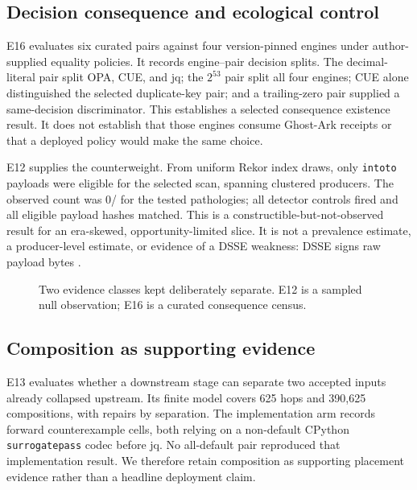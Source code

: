 \documentclass[10pt,twocolumn,letterpaper]{article}
\newcommand{\ghostark}{Ghost-Ark}
\begin{document}
\subsection{Decision consequence and ecological control}

E16 evaluates six curated pairs against four version-pinned engines under
author-supplied equality policies.  It records \pnESixteenCells{} engine--pair
decision splits.  The decimal-literal pair split OPA, CUE, and jq; the
$2^{53}$ pair split all four engines; CUE alone distinguished the selected
duplicate-key pair; and a trailing-zero pair supplied a same-decision
discriminator.  This establishes a selected consequence existence result.  It
does not establish that those engines consume \ghostark{} receipts or that a
deployed policy would make the same choice.

E12 supplies the counterweight.  From \pnETwelveDraws{} uniform Rekor index
draws, only \pnETwelveEligible{} \texttt{intoto} payloads were eligible for
the selected scan, spanning \pnETwelveProducers{} clustered producers.
The observed count was 0/\pnETwelveEligible{} for the tested pathologies; all
\pnETwelveControls{} detector controls fired and all eligible payload hashes
matched.  This is a constructible-but-not-observed result for an
era-skewed, opportunity-limited slice.  It is not a prevalence estimate, a
producer-level estimate, or evidence of a DSSE weakness: DSSE signs raw
payload bytes \cite{dssev1}.

\begin{figure}[t]
  \centering
  \resizebox{\columnwidth}{!}{}
  \caption{Two evidence classes kept deliberately separate.  E12 is a
  sampled null observation; E16 is a curated consequence census.}
  \label{fig:e12-e16}
\end{figure}

\subsection{Composition as supporting evidence}

E13 evaluates whether a downstream stage can separate two accepted inputs
already collapsed upstream.  Its finite model covers 625 hops and 390,625
compositions, with \pnEThirteenRepairsBySeparation{} repairs by separation.
The implementation arm records \pnEThirteenForward{} forward counterexample
cells, both relying on a non-default CPython \texttt{surrogatepass} codec
before jq.  No all-default pair reproduced that implementation result.  We
therefore retain composition as supporting placement evidence rather than a
headline deployment claim.
\end{document}
